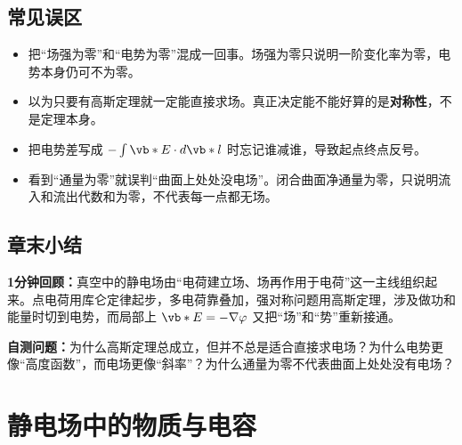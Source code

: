 \documentclass[lang=cn,11pt]{elegantbook}
\newcommand{\summaryline}[1]{\par\noindent\textbf{1分钟回顾：}#1\par}
\newcommand{\chapterselfcheck}[1]{\par\noindent\textbf{自测问题：}#1\par}
\begin{document}
\section{常见误区}

\begin{itemize}
 \item 把“场强为零”和“电势为零”混成一回事。场强为零只说明一阶变化率为零，电势本身仍可不为零。
 \item 以为只要有高斯定理就一定能直接求场。真正决定能不能好算的是\textbf{对称性}，不是定理本身。
 \item 把电势差写成 \(-\int \vb*{E}\cdot d\vb*{l}\) 时忘记谁减谁，导致起点终点反号。
 \item 看到“通量为零”就误判“曲面上处处没电场”。闭合曲面净通量为零，只说明流入和流出代数和为零，不代表每一点都无场。
\end{itemize}

\section{章末小结}

\summaryline{真空中的静电场由“电荷建立场、场再作用于电荷”这一主线组织起来。点电荷用库仑定律起步，多电荷靠叠加，强对称问题用高斯定理，涉及做功和能量时切到电势，而局部上 \(\vb*{E}=-\nabla\varphi\) 又把“场”和“势”重新接通。}
\chapterselfcheck{为什么高斯定理总成立，但并不总是适合直接求电场？为什么电势更像“高度函数”，而电场更像“斜率”？为什么通量为零不代表曲面上处处没有电场？}

\chapter{静电场中的物质与电容}
\end{document}
